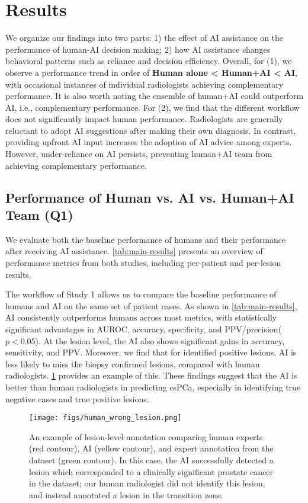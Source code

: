 
\section{Results}




We organize our findings into two parts: 1) the effect of AI assistance on the performance of human-AI decision making; 2) how AI assistance changes behavioral patterns such as reliance and decision efficiency.
Overall, for (1), we observe a performance trend in order of \textbf{Human alone < Human+AI < AI}, with occasional instances of individual radiologists achieving complementary performance. It is also worth noting the ensemble of human+AI could outperform AI, i.e., complementary performance. 
For (2), we find that the different workflow does not significantly impact human performance. Radiologists are generally reluctant to adopt AI suggestions after making their own diagnosis. In contrast, providing upfront AI input increases the adoption of AI advice among experts. However, under-reliance on AI persists, preventing human+AI team from achieving complementary performance. 

\subsection{Performance of Human vs. AI vs. Human+AI Team (Q1)}
We evaluate both the baseline performance of humans and their performance after receiving AI assistance.
\cref{tab:main-results} presents an overview of performance metrics from both studies, including per-patient and per-lesion results. 

The workflow of Study 1 allows us to compare the baseline performance of humans and AI on the same set of patient cases. 
As shown in \cref{tab:main-results}, 
AI consistently outperforms humans across most metrics, with statistically significant advantages in AUROC, accuracy, specificity, and PPV/precision($p<0.05$).
At the lesion level, the AI also shows significant gains in accuracy, sensitivity, and PPV. Moreover, we find that for identified positive lesions, AI is less likely to miss the biopsy confirmed lesions, compared with human radiologists. \cref{fig:human-wrong-lesion} provides an example of this.
These findings suggest that the AI is better than human radiologists in predicting csPCa, especially in identifying true negative cases and true positive lesions.



\begin{figure}[t]
    \centering
    \texttt{[image: figs/human\_wrong\_lesion.png]}
    \caption{An example of lesion-level annotation comparing human experts (red contour), AI (yellow contour), and expert annotation from the dataset (green contour). In this case, the AI successfully detected a lesion which corresponded to a clinically significant prostate cancer in the dataset; our human radiologist did not identify this lesion, and instead annotated a lesion in the transition zone.}
    \label{fig:human-wrong-lesion}
\end{figure}

